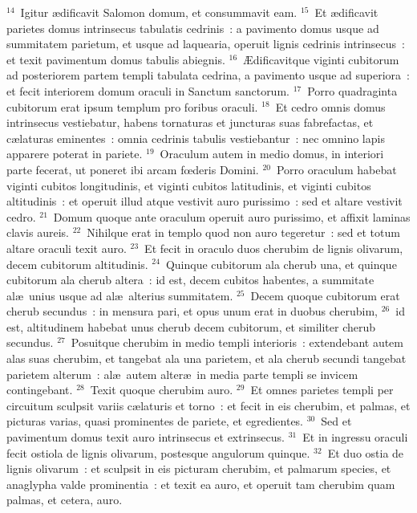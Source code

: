 ${}^{14}$~Igitur \ae dificavit Salomon domum, et consummavit eam.
${}^{15}$~Et \ae dificavit parietes domus intrinsecus tabulatis cedrinis~: a pavimento domus usque ad summitatem parietum, et usque ad laquearia, operuit lignis cedrinis intrinsecus~: et texit pavimentum domus tabulis abiegnis.
${}^{16}$~\AE dificavitque viginti cubitorum ad posteriorem partem templi tabulata cedrina, a pavimento usque ad superiora~: et fecit interiorem domum oraculi in Sanctum sanctorum.
${}^{17}$~Porro quadraginta cubitorum erat ipsum templum pro foribus oraculi.
${}^{18}$~Et cedro omnis domus intrinsecus vestiebatur, habens tornaturas et juncturas suas fabrefactas, et c\ae laturas eminentes~: omnia cedrinis tabulis vestiebantur~: nec omnino lapis apparere poterat in pariete.
${}^{19}$~Oraculum autem in medio domus, in interiori parte fecerat, ut poneret ibi arcam fœderis Domini.
${}^{20}$~Porro oraculum habebat viginti cubitos longitudinis, et viginti cubitos latitudinis, et viginti cubitos altitudinis~: et operuit illud atque vestivit auro purissimo~: sed et altare vestivit cedro.
${}^{21}$~Domum quoque ante oraculum operuit auro purissimo, et affixit laminas clavis aureis.
${}^{22}$~Nihilque erat in templo quod non auro tegeretur~: sed et totum altare oraculi texit auro.
${}^{23}$~Et fecit in oraculo duos cherubim de lignis olivarum, decem cubitorum altitudinis.
${}^{24}$~Quinque cubitorum ala cherub una, et quinque cubitorum ala cherub altera~: id est, decem cubitos habentes, a summitate al\ae\ unius usque ad al\ae\ alterius summitatem.
${}^{25}$~Decem quoque cubitorum erat cherub secundus~: in mensura pari, et opus unum erat in duobus cherubim,
${}^{26}$~id est, altitudinem habebat unus cherub decem cubitorum, et similiter cherub secundus.
${}^{27}$~Posuitque cherubim in medio templi interioris~: extendebant autem alas suas cherubim, et tangebat ala una parietem, et ala cherub secundi tangebat parietem alterum~: al\ae\ autem alter\ae\ in media parte templi se invicem contingebant.
${}^{28}$~Texit quoque cherubim auro.
${}^{29}$~Et omnes parietes templi per circuitum sculpsit variis c\ae laturis et torno~: et fecit in eis cherubim, et palmas, et picturas varias, quasi prominentes de pariete, et egredientes.
${}^{30}$~Sed et pavimentum domus texit auro intrinsecus et extrinsecus.
${}^{31}$~Et in ingressu oraculi fecit ostiola de lignis olivarum, postesque angulorum quinque.
${}^{32}$~Et duo ostia de lignis olivarum~: et sculpsit in eis picturam cherubim, et palmarum species, et anaglypha valde prominentia~: et texit ea auro, et operuit tam cherubim quam palmas, et cetera, auro.

